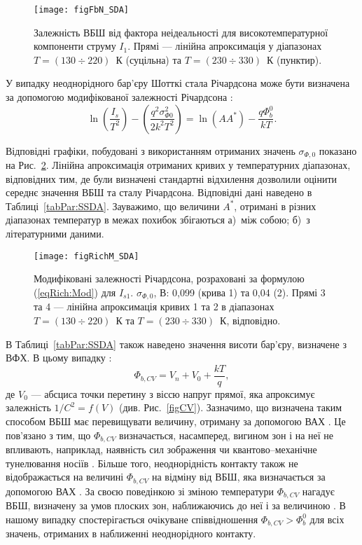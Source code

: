 \begin{figure}
\center
\texttt{[image: figFbN\_SDA]}
\caption{\label{figFbN_SDA}
Залежність ВБШ від фактора неідеальності для високотемпературної компоненти струму $I_1$.
Прямі --- лінійна апроксимація у діапазонах $T=(130\div220)$~К (суцільна) та $T=(230\div330)$~К (пунктир).
}%
\end{figure}

У випадку неоднорідного бар'єру Шотткі стала Річардсона може бути визначена за
допомогою модифікованої залежності Річардсона \cite{Tascioglu2010old,Yildirim2010}:
\begin{equation} \label{eqRich:Mod}
\ln\left(\frac{I_s}{T^2}\right)-\left(\frac{q^2\sigma_{\Phi0}^2}{2k^2T^2}\right)=\ln(AA^*)-\frac{q\Phi_b^0}{kT}.
\end{equation}

Відповідні графіки, побудовані з використанням отриманих значень $\sigma_{\Phi,0}$ показано на Рис.~\ref{figRichM_SDA}.
Лінійна апроксимація отриманих кривих у температурних діапазонах, відповідних тим, де були визначені стандартні відхилення
дозволили оцінити середнє значення ВБШ та сталу Річардсона.
Відповідні дані наведено в Таблиці~\ref{tabPar:SSDA}.
Зауважимо, що величини $A^*$, отримані в різних діапазонах температур в межах похибок збігаються
а)~між собою;
б)~з літературними даними.


\begin{figure}
\center
\texttt{[image: figRichM\_SDA]}
\caption{\label{figRichM_SDA}
Модифіковані залежності Річардсона, розраховані за формулою (\ref{eqRich:Mod}) для $I_{s1}$.
$\sigma_{\Phi,0}$, В: 0,099 (крива 1) та 0,04 (2).
Прямі 3 та 4 --- лінійна апроксимація кривих 1 та 2 в діапазонах $T=(130\div220)$~К
та $T=(230\div330)$~К, відповідно.
}%
\end{figure}

В Таблиці~\ref{tabPar:SSDA} також наведено значення висоти бар'єру, визначене з ВФХ.
В цьому випадку  \cite{Rhoderick1988,Schroder2006}:
\begin{equation}\label{eqFbCV}
\Phi_{b,CV}=V_n+V_0+\frac{kT}{q},
\end{equation}
де
$V_0$ --- абсциса точки перетину з віссю напруг прямої, яка апроксимує залежність $1/C^2=f(V)$ (див. Рис.~\ref{figCV}).
Зазначимо, що визначена таким способом ВБШ має перевищувати величину, отриману за допомогою ВАХ
\cite{Rhoderick1988,GELCZUK2014,Mohan,Cetin2005,Soylu,Yildirim2010,Karatas:2006NIMA}.
Це пов'язано з тим, що $\Phi_{b,CV}$ визначається, насамперед, вигином зон і на неї не впливають, наприклад,
наявність сил зображення чи квантово--механічне тунелювання носіїв \cite{Rhoderick1988,GELCZUK2014,Mohan}.
Більше того, неоднорідність контакту також не відображається на величині $\Phi_{b,CV}$ на відміну від ВБШ,
яка визначається за допомогою ВАХ \cite{Sullivan,Tung:PhysRev,GELCZUK2014,Mohan}.
За своєю поведінкою зі зміною температури $\Phi_{b,CV}$ нагадує ВБШ, визначену за умов плоских зон, наближаючись
до неї і за величиною \cite{Cetin2005,Soylu,Yildirim2010,Mohan}.
В нашому випадку спостерігається очікуване співвідношення $\Phi_{b,CV}>\Phi_b^0$ для всіх значень, отриманих
в наближенні неоднорідного контакту.

